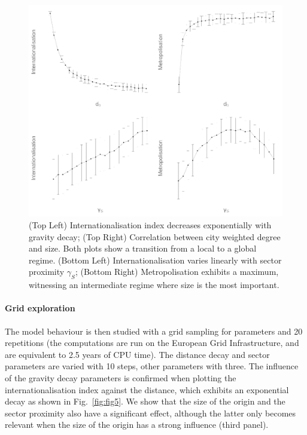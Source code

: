 \documentclass[10pt,letterpaper]{article}
\begin{document}
\begin{figure}
	\begin{center}
	    \includegraphics[width=\linewidth]{figures/Fig4.png}
	\end{center}
	\vspace{2cm}
    \caption{(Top Left) Internationalisation index decreases exponentially with gravity decay; (Top Right) Correlation between city weighted degree and size. Both plots show a transition from a local to a global regime. (Bottom Left) Internationalisation varies linearly with sector proximity $\gamma_S$; (Bottom Right) Metropolisation exhibits a maximum, witnessing an intermediate regime where size is the most important. \label{fig:fig4}}
\end{figure}



\paragraph{Grid exploration}

The model behaviour is then studied with a grid sampling for parameters and 20 repetitions (the computations are run on the European Grid Infrastructure, and are equivalent to 2.5 years of CPU time). The distance decay and sector parameters are varied with 10 steps, other parameters with three. The influence of the gravity decay parameters is confirmed when plotting the internationalisation index against the distance, which exhibits an exponential decay as shown in Fig.~\ref{fig:fig5}. We show that the size of the origin and the sector proximity also have a significant effect, although the latter only becomes relevant when the size of the origin has a strong influence (third panel).
\end{document}

